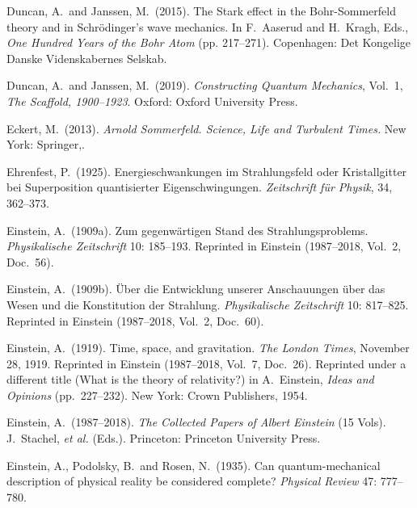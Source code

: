 \documentclass[12pt]{article}
\numberwithin{equation}{section}
\begin{document}
\begin{thebibliography}{}
 Duncan, A.\ and Janssen, M.\  (2015).  The Stark effect in the Bohr-Sommerfeld theory and in Schr\"odinger's wave mechanics. In F.\ Aaserud and H.\ Kragh, Eds., \emph{One Hundred Years of the Bohr Atom} (pp. 217--271). Copenhagen: Det Kongelige Danske Videnskabernes Selskab.

 Duncan, A.\ and Janssen, M.\  (2019). \emph{Constructing Quantum Mechanics}, Vol.\ 1, \emph{The Scaffold, 1900--1923}. Oxford: Oxford University Press.

 Eckert, M.\ (2013). \emph{Arnold Sommerfeld. Science, Life and Turbulent Times.} New York: Springer,.

 Ehrenfest, P.\ (1925). Energieschwankungen im Strahlungsfeld oder Kristallgitter bei Superposition quantisierter Eigenschwingungen. \emph{Zeitschrift f\"ur Physik}, 34, 362--373.

 Einstein, A.\ (1909a). Zum gegenw\"artigen Stand des Strahlungsproblems. \emph{Physikalische Zeitschrift} 10: 185--193. Reprinted in Einstein (1987--2018, Vol.\ 2, Doc.\ 56).

 Einstein, A.\ (1909b). \"Uber die Entwicklung unserer Anschauungen \"uber das Wesen und die Konstitution der Strahlung. \emph{Physikalische Zeitschrift} 10: 817--825. Reprinted in Einstein (1987--2018, Vol.\ 2, Doc.\ 60).

 Einstein, A.\ (1919). Time, space, and gravitation. \emph{The London Times}, November 28, 1919. Reprinted in Einstein (1987--2018, Vol.\ 7, Doc.\ 26).
Reprinted under a different title (What is the theory of relativity?) in A.\ Einstein, \emph{Ideas and Opinions} (pp.\ 227--232). New York: Crown Publishers, 1954.

 Einstein, A.\ (1987--2018). \emph{The Collected Papers of Albert Einstein} (15 Vols).  J.\ Stachel, \emph{et al.} (Eds.). Princeton: Princeton University Press.

 Einstein, A., Podolsky, B.\ and Rosen, N.\ (1935). Can quantum-mechanical description of physical reality be considered complete? \emph{Physical Review} 47: 777--780.


\end{thebibliography}
\end{document}
